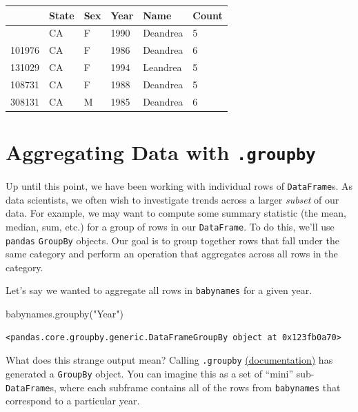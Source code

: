 \documentclass[
  letterpaper,
  DIV=11,
  numbers=noendperiod]{scrreprt}
\newenvironment{Shaded}{\begin{snugshade}}{\end{snugshade}}
\newcommand{\NormalTok}[1]{\textcolor[rgb]{0.00,0.23,0.31}{#1}}
\newcommand{\StringTok}[1]{\textcolor[rgb]{0.13,0.47,0.30}{#1}}
\begin{document}
\begin{longtable}[]{@{}llllll@{}}
\toprule\noalign{}
& State & Sex & Year & Name & Count \\
\midrule\noalign{}
\endhead
\bottomrule\noalign{}
\endlastfoot
115957 & CA & F & 1990 & Deandrea & 5 \\
101976 & CA & F & 1986 & Deandrea & 6 \\
131029 & CA & F & 1994 & Leandrea & 5 \\
108731 & CA & F & 1988 & Deandrea & 5 \\
308131 & CA & M & 1985 & Deandrea & 6 \\
\end{longtable}

\section{\texorpdfstring{Aggregating Data with
\texttt{.groupby}}{Aggregating Data with .groupby}}\label{aggregating-data-with-.groupby}

Up until this point, we have been working with individual rows of
\texttt{DataFrame}s. As data scientists, we often wish to investigate
trends across a larger \emph{subset} of our data. For example, we may
want to compute some summary statistic (the mean, median, sum, etc.) for
a group of rows in our \texttt{DataFrame}. To do this, we'll use
\texttt{pandas} \texttt{GroupBy} objects. Our goal is to group together
rows that fall under the same category and perform an operation that
aggregates across all rows in the category.

Let's say we wanted to aggregate all rows in \texttt{babynames} for a
given year.

\begin{Shaded}
\begin{Highlighting}[]
\NormalTok{babynames.groupby(}\StringTok{"Year"}\NormalTok{)}
\end{Highlighting}
\end{Shaded}

\begin{verbatim}
<pandas.core.groupby.generic.DataFrameGroupBy object at 0x123fb0a70>
\end{verbatim}

What does this strange output mean? Calling \texttt{.groupby}
\href{https://pandas.pydata.org/pandas-docs/stable/reference/api/pandas.DataFrame.groupby.html}{(documentation)}
has generated a \texttt{GroupBy} object. You can imagine this as a set
of ``mini'' sub-\texttt{DataFrame}s, where each subframe contains all of
the rows from \texttt{babynames} that correspond to a particular year.
\end{document}
